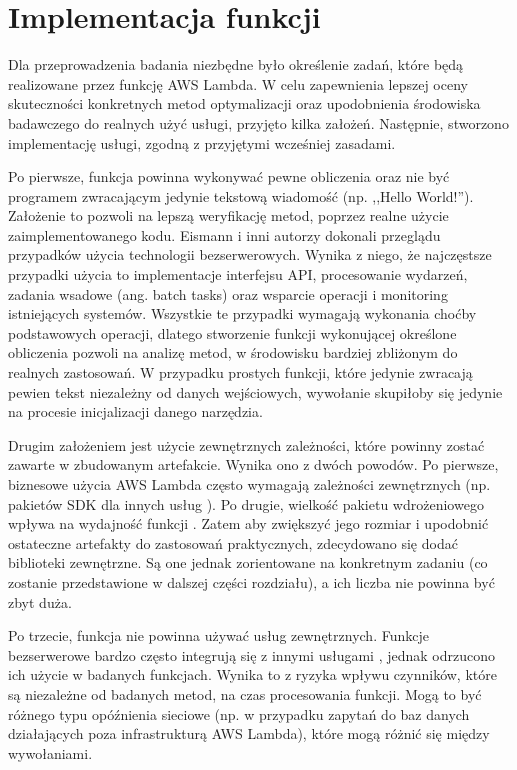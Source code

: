 \section{Implementacja funkcji}\label{chapter:implementacja_funkcji}

Dla przeprowadzenia badania niezbędne było określenie zadań, które będą realizowane przez funkcję AWS Lambda.
W celu zapewnienia lepszej oceny skuteczności konkretnych metod optymalizacji oraz upodobnienia środowiska badawczego do realnych użyć usługi, przyjęto kilka założeń.
Następnie, stworzono implementację usługi, zgodną z przyjętymi wcześniej zasadami.

Po pierwsze, funkcja powinna wykonywać pewne obliczenia oraz nie być programem zwracającym jedynie tekstową wiadomość (np. ,,Hello World!''). 
Założenie to pozwoli na lepszą weryfikację metod, poprzez realne użycie zaimplementowanego kodu.
Eismann i inni autorzy \cite{eismann2021reviewserverlessusecases} dokonali przeglądu przypadków użycia technologii bezserwerowych.
Wynika z niego, że najczęstsze przypadki użycia to implementacje interfejsu API, procesowanie wydarzeń, zadania wsadowe (ang. batch tasks) oraz wsparcie operacji i monitoring istniejących systemów.
Wszystkie te przypadki wymagają wykonania choćby podstawowych operacji, dlatego stworzenie funkcji wykonującej określone obliczenia pozwoli na analizę metod, w środowisku bardziej zbliżonym do realnych zastosowań.
W przypadku prostych funkcji, które jedynie zwracają pewien tekst niezależny od danych wejściowych, wywołanie skupiłoby się jedynie na procesie inicjalizacji danego narzędzia.

Drugim założeniem jest użycie zewnętrznych zależności, które powinny zostać zawarte w zbudowanym artefakcie.
Wynika ono z dwóch powodów. Po pierwsze, biznesowe użycia AWS Lambda często wymagają zależności zewnętrznych (np. pakietów SDK dla innych usług \cite{eismann2021reviewserverlessusecases}).
Po drugie, wielkość pakietu wdrożeniowego wpływa na wydajność funkcji \cite{8116416}\cite{9095731}.
Zatem aby zwiększyć jego rozmiar i upodobnić ostateczne artefakty do zastosowań praktycznych, zdecydowano się dodać biblioteki zewnętrzne.
Są one jednak zorientowane na konkretnym zadaniu (co zostanie przedstawione w dalszej części rozdziału), a ich liczba nie powinna być zbyt duża.

Po trzecie, funkcja nie powinna używać usług zewnętrznych.
Funkcje bezserwerowe bardzo często integrują się z innymi usługami \cite{eismann2021reviewserverlessusecases}, jednak odrzucono ich użycie w badanych funkcjach.
Wynika to z ryzyka wpływu czynników, które są niezależne od badanych metod, na czas procesowania funkcji.
Mogą to być różnego typu opóźnienia sieciowe (np. w przypadku zapytań do baz danych działających poza infrastrukturą AWS Lambda), które mogą różnić się między wywołaniami.

